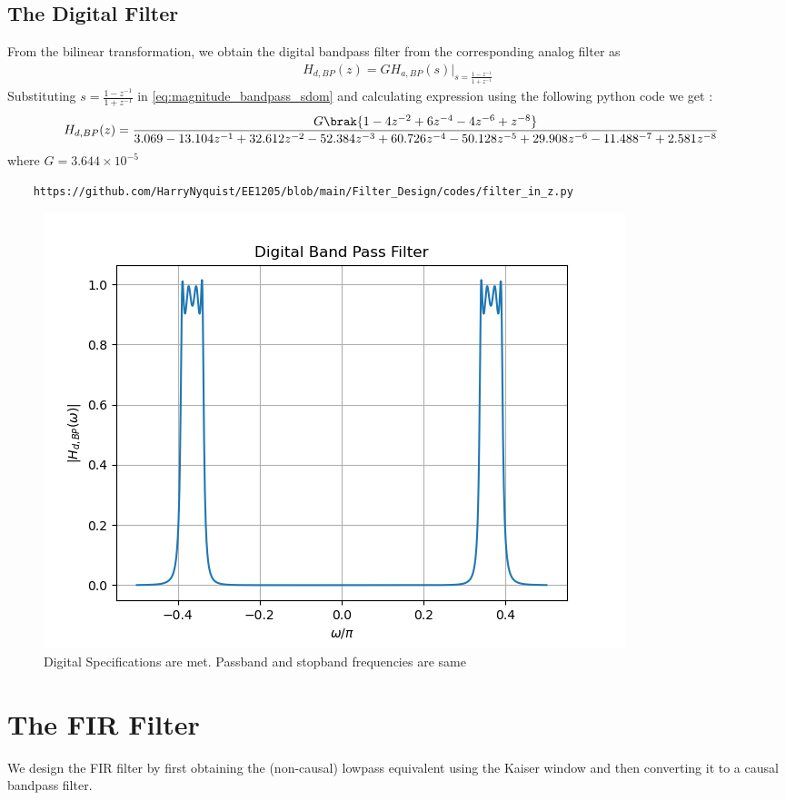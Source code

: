 \documentclass{article}
\begin{document}
\subsection{The Digital Filter}
From the bilinear transformation, we obtain the digital bandpass filter from the corresponding analog filter as
\begin{align}
    H_{d,BP}(z) = GH_{a,BP}(s)\vert_{s = \frac{1-z^{-1}}{1 + z^{-1}}}
\end{align}
Substituting $s=\frac{1-z^{-1}}{1+z^{-1}}$ in \eqref{eq:magnitude_bandpass_sdom} and calculating expression using the following python code we get :
\begin{align}
    H_{d,BP}(z) &= \frac{G\brak{1 - 4z^{-2} + 6z^{-4} - 4z^{-6} + z^{-8}}}{3.069 - 13.104z^{-1} + 32.612z^{-2} - 52.384z^{-3} + 60.726z^{-4} - 50.128z^{-5} + 29.908z^{-6} - 11.488^{-7} + 2.581z^{-8}}
\end{align}
where $G=3.644\times 10^{-5}$    
\begin{lstlisting}
    https://github.com/HarryNyquist/EE1205/blob/main/Filter_Design/codes/filter_in_z.py
\end{lstlisting}
\begin{figure}[H]
\centering
\includegraphics[width=1\columnwidth]{figs/Digital_BPF.png}
\caption{Digital Specifications are met. Passband and stopband frequencies are same}
\label{fig:Digital_BFP}
\end{figure}
\section{The FIR Filter}
We design the FIR filter by first obtaining the (non-causal) lowpass equivalent using the Kaiser window
and then
converting it to a causal bandpass filter.
\end{document}
